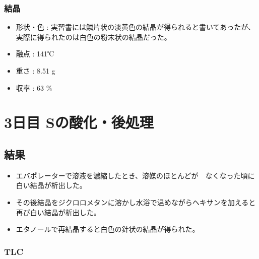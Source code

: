 \documentclass[a4paper,papersize,dvipdfmx]{jsarticle}
\begin{document}
\subsubsection*{結晶}
\begin{itemize}
\item 形状・色 : 実習書には鱗片状の淡黄色の結晶が得られると書いてあったが、実際に得られたのは白色の粉末状の結晶だった。
\item 融点 : 141℃
\item 重さ : 8.51 g
\item 収率 : 63 $\%$

\end{itemize}
\section*{3日目 Sの酸化・後処理}
\subsection*{結果}
\begin{itemize}
\item エバポレーターで溶液を濃縮したとき、溶媒のほとんどが　なくなった頃に白い結晶が析出した。
\item その後結晶をジクロロメタンに溶かし水浴で温めながらヘキサンを加えると再び白い結晶が析出した。
\item エタノールで再結晶すると白色の針状の結晶が得られた。

\end{itemize}
\subsubsection*{TLC}
\end{document}
